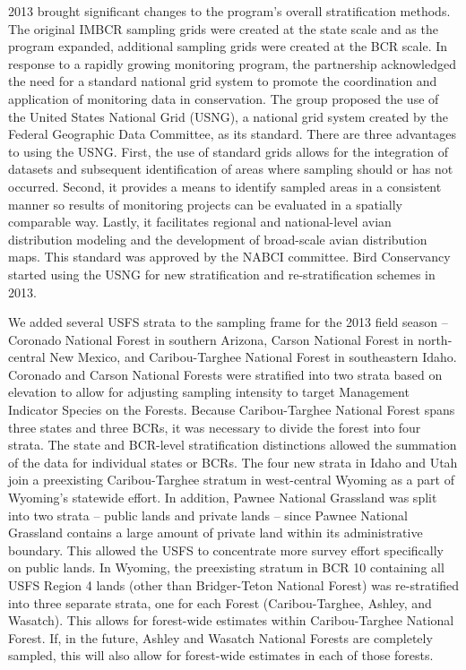 \documentclass[
  letterpaper,
  DIV=11,
  numbers=noendperiod,
  oneside]{scrreprt}
\begin{document}

2013 brought significant changes to the program's overall stratification
methods. The original IMBCR sampling grids were created at the state
scale and as the program expanded, additional sampling grids were
created at the BCR scale. In response to a rapidly growing monitoring
program, the partnership acknowledged the need for a standard national
grid system to promote the coordination and application of monitoring
data in conservation. The group proposed the use of the United States
National Grid (USNG), a national grid system created by the Federal
Geographic Data Committee, as its standard. There are three advantages
to using the USNG. First, the use of standard grids allows for the
integration of datasets and subsequent identification of areas where
sampling should or has not occurred. Second, it provides a means to
identify sampled areas in a consistent manner so results of monitoring
projects can be evaluated in a spatially comparable way. Lastly, it
facilitates regional and national-level avian distribution modeling and
the development of broad-scale avian distribution maps. This standard
was approved by the NABCI committee. Bird Conservancy started using the
USNG for new stratification and re-stratification schemes in 2013.

We added several USFS strata to the sampling frame for the 2013 field
season -- Coronado National Forest in southern Arizona, Carson National
Forest in north-central New Mexico, and Caribou-Targhee National Forest
in southeastern Idaho. Coronado and Carson National Forests were
stratified into two strata based on elevation to allow for adjusting
sampling intensity to target Management Indicator Species on the
Forests. Because Caribou-Targhee National Forest spans three states and
three BCRs, it was necessary to divide the forest into four strata. The
state and BCR-level stratification distinctions allowed the summation of
the data for individual states or BCRs. The four new strata in Idaho and
Utah join a preexisting Caribou-Targhee stratum in west-central Wyoming
as a part of Wyoming's statewide effort. In addition, Pawnee National
Grassland was split into two strata -- public lands and private lands --
since Pawnee National Grassland contains a large amount of private land
within its administrative boundary. This allowed the USFS to concentrate
more survey effort specifically on public lands. In Wyoming, the
preexisting stratum in BCR 10 containing all USFS Region 4 lands (other
than Bridger-Teton National Forest) was re-stratified into three
separate strata, one for each Forest (Caribou-Targhee, Ashley, and
Wasatch). This allows for forest-wide estimates within Caribou-Targhee
National Forest. If, in the future, Ashley and Wasatch National Forests
are completely sampled, this will also allow for forest-wide estimates
in each of those forests.
\end{document}

